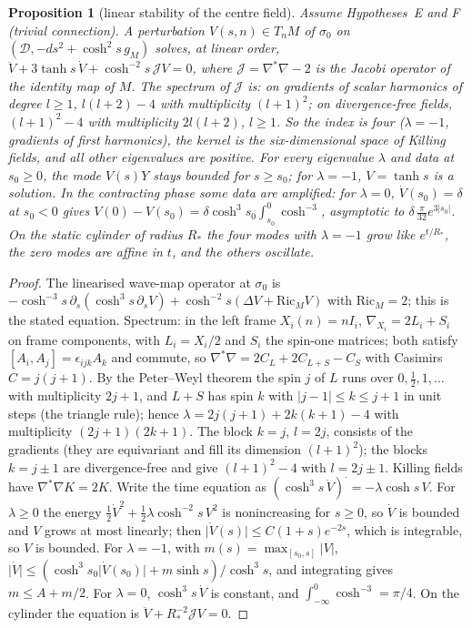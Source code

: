 \documentclass[aps,pra,onecolumn,superscriptaddress,nofootinbib,10pt]{revtex4-2}
\newtheorem{proposition}[theorem]{Proposition}
\theoremstyle{definition}
\theoremstyle{remark}
\newcommand{\cD}{\mathcal{D}}
\begin{document}
\begin{proposition}[linear stability of the centre field]\label{prop:stability}
Assume Hypotheses~E and F (trivial connection).  A perturbation $V(s,n)\in T_nM$ of $\sigma_0$ on
$(\cD,-ds^2+\cosh^2s\,g_M)$ solves, at linear order, $\ddot V+3\tanh s\,\dot V+\cosh^{-2}s\,\mathcal JV=0$,
where $\mathcal J=\nabla^*\nabla-2$ is the Jacobi operator of the identity map of $M$.  The spectrum of $\mathcal J$ is:
on gradients of scalar harmonics of degree $l\ge1$, $l(l+2)-4$ with multiplicity $(l+1)^2$; on divergence-free
fields, $(l+1)^2-4$ with multiplicity $2l(l+2)$, $l\ge1$.  So the index is four ($\lambda=-1$, gradients of first
harmonics), the kernel is the six-dimensional space of Killing fields, and all other eigenvalues are
positive.  For every eigenvalue $\lambda$ and data at $s_0\ge0$, the mode $V(s)Y$ stays bounded for $s\ge s_0$; for
$\lambda=-1$, $V=\tanh s$ is a solution.  In the contracting phase some data are amplified: for $\lambda=0$,
$\dot V(s_0)=\delta$ at $s_0<0$ gives $V(0)-V(s_0)=\delta\cosh^3s_0\int_{s_0}^0\cosh^{-3}$, asymptotic to
$\delta\,\tfrac{\pi}{32}e^{3\lvert s_0\rvert}$.  On the static cylinder of radius $R_*$ the four modes with $\lambda=-1$
grow like $e^{t/R_*}$, the zero modes are affine in $t$, and the others oscillate.
\end{proposition}
\begin{proof}
The linearised wave-map operator at $\sigma_0$ is $-\cosh^{-3}s\,\partial_s(\cosh^3s\,\partial_sV)+\cosh^{-2}s
(\Delta V+\mathrm{Ric}_M V)$ with $\mathrm{Ric}_M=2$; this is the stated equation.  Spectrum: in the left
frame $X_i(n)=nI_i$, $\nabla_{X_i}=2L_i+S_i$ on frame components, with $L_i=X_i/2$ and $S_i$ the spin-one
matrices; both satisfy $[A_i,A_j]=\epsilon_{ijk}A_k$ and commute, so
$\nabla^*\nabla=2C_L+2C_{L+S}-C_S$ with Casimirs $C=j(j+1)$.  By the Peter--Weyl theorem the spin $j$ of $L$ runs
over $0,\tfrac12,1,\dots$ with multiplicity $2j+1$, and $L+S$ has spin $k$ with $\lvert j-1\rvert\le k\le j+1$ in unit steps (the triangle rule); hence
$\lambda=2j(j+1)+2k(k+1)-4$ with multiplicity $(2j+1)(2k+1)$.  The block $k=j$, $l=2j$, consists of the gradients
(they are equivariant and fill its dimension $(l+1)^2$); the blocks $k=j\pm1$ are divergence-free and give
$(l+1)^2-4$ with $l=2j\pm1$.  Killing fields have $\nabla^*\nabla K=2K$.  Write the time equation as
$(\cosh^3s\,\dot V)^\cdot=-\lambda\cosh s\,V$.  For $\lambda\ge0$ the energy
$\tfrac12\dot V^2+\tfrac12\lambda\cosh^{-2}s\,V^2$ is nonincreasing for $s\ge0$, so $\dot V$ is bounded and $V$ grows
at most linearly; then $\lvert\dot V(s)\rvert\le C(1+s)e^{-2s}$, which is integrable, so $V$ is bounded.  For
$\lambda=-1$, with $m(s)=\max_{[s_0,s]}\lvert V\rvert$, $\lvert\dot V\rvert\le(\cosh^3s_0\lvert\dot V(s_0)\rvert+m\sinh s)/\cosh^3s$,
and integrating gives $m\le A+m/2$.  For $\lambda=0$, $\cosh^3s\,\dot V$ is constant, and
$\int_{-\infty}^0\cosh^{-3}=\pi/4$.  On the cylinder the equation is $\ddot V+R_*^{-2}\mathcal JV=0$.
\end{proof}
\end{document}
